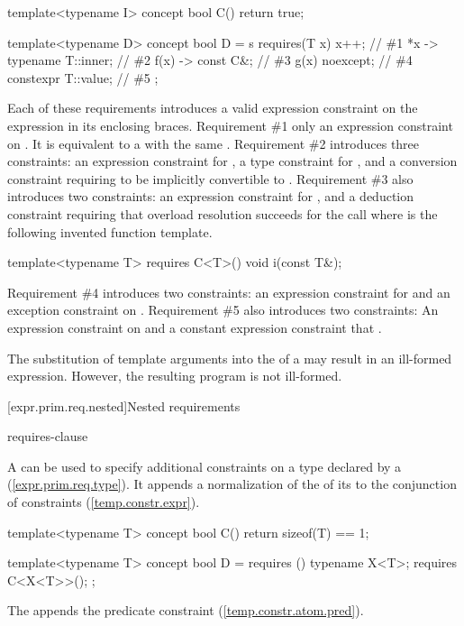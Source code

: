 \pnum
\enterexample
\begin{codeblock}
template<typename I> concept bool C() { return true; }

template<typename D> concept bool D = s
  requires(T x) {
    {x++};                     // \#1
    {*x} -> typename T::inner; // \#2
    {f(x)} -> const C&;        // \#3
    {g(x)} noexcept;           // \#4
    constexpr {T::value};      // \#5
  };
\end{codeblock}
Each of these requirements introduces a valid expression constraint
on the expression in its enclosing braces.
% 
Requirement \#1 only an expression constraint on . It is 
equivalent to a  
with the same .
% 
Requirement \#2  introduces three constraints: an 
expression constraint for , a type constraint
for , and a conversion constraint
requiring  to be implicitly convertible to 
.
% 
Requirement \#3 also introduces two constraints: an
expression constraint for , and a deduction
constraint requiring that overload resolution succeeds for the
call  where  is the following
invented function template.
\begin{codeblock}
template<typename T> requires C<T>() void i(const T&);
\end{codeblock}
% 
Requirement \#4 introduces two constraints: an expression constraint
for  and an exception constraint on
.
% 
Requirement \#5 also introduces two constraints: An expression constraint
on  and a constant expression constraint that
.

\pnum
The substitution of template arguments into the
 of a 
 may result
in an ill-formed expression. However, the resulting program is not 
ill-formed. 


[expr.prim.req.nested]{Nested requirements}

\begin{bnf}
\br
  requires-clause \terminal{;}
\end{bnf}

\pnum
A  can be used
to specify additional constraints on a type declared by a
(\ref{expr.prim.req.type}).
% 
It appends a normalization of the 
of its  to the
conjunction of constraints (\ref{temp.constr.expr}).
% 
\enterexample 
\begin{codeblock}
template<typename T> concept bool C() { return sizeof(T) == 1; }

template<typename T> concept bool D =
  requires () {
    typename X<T>;
    requires C<X<T>>();
  };
\end{codeblock}
The  appends
the predicate constraint 
(\ref{temp.constr.atom.pred}).
\exitexample
